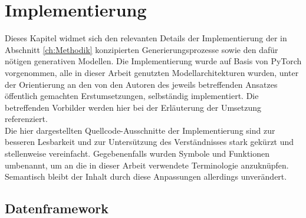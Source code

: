 \chapter{Implementierung}
\label{ch:Implementierung}

Dieses Kapitel widmet sich den relevanten Details der Implementierung der in Abschnitt \ref{ch:Methodik} konzipierten Generierungsprozesse sowie den dafür nötigen generativen Modellen. Die Implementierung wurde auf Basis von PyTorch vorgenommen, alle in dieser Arbeit genutzten Modellarchitekturen wurden, unter der Orientierung an den von den Autoren des jeweils betreffenden Ansatzes öffentlich gemachten Erstumsetzungen, selbständig implementiert. Die betreffenden Vorbilder werden hier bei der Erläuterung der Umsetzung referenziert. \\
Die hier dargestellten Quellcode-Ausschnitte der Implementierung sind zur besseren Lesbarkeit und zur Untersützung des Verständnisses stark gekürzt und stellenweise vereinfacht. Gegebenenfalls wurden Symbole und Funktionen umbenannt, um an die in dieser Arbeit verwendete Terminologie anzuknüpfen. Semantisch bleibt der Inhalt durch diese Anpassungen allerdings unverändert.





\section {Datenframework}

